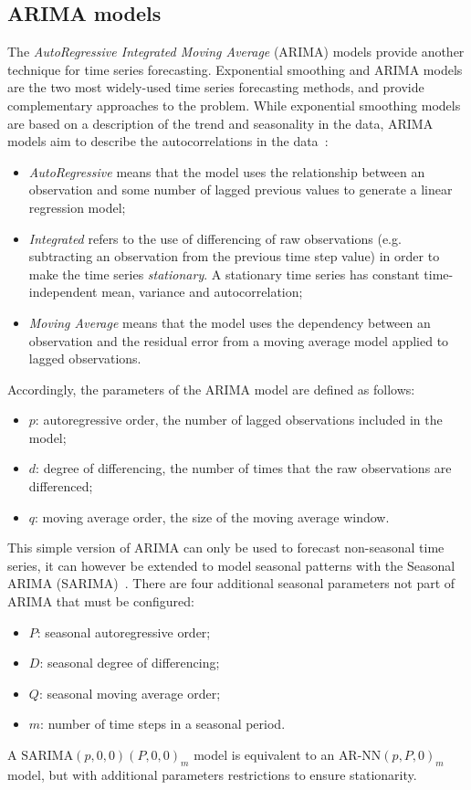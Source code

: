 \subsection{ARIMA models}
\label{subsec:arima_models}
The \emph{AutoRegressive Integrated Moving Average} (ARIMA) models provide another technique for time series forecasting. Exponential smoothing and ARIMA models are the two most widely-used time series forecasting methods, and provide complementary approaches to the problem. While exponential smoothing models are based on a description of the trend and seasonality in the data, ARIMA models aim to describe the autocorrelations in the data~\cite{jenkins}:
\begin{itemize}
  \item \emph{AutoRegressive} means that the model uses the relationship between an observation and some number of lagged previous values to generate a linear regression model;
  \item \emph{Integrated} refers to the use of differencing of raw observations (e.g. subtracting an observation from the previous time step value) in order to make the time series \emph{stationary}. A stationary time series has constant time-independent mean, variance and autocorrelation;
  \item \emph{Moving Average} means that the model uses the dependency between an observation and the residual error from a moving average model applied to lagged observations.
\end{itemize}
Accordingly, the parameters of the ARIMA model are defined as follows:
\begin{itemize}
  \item \( p \): autoregressive order, the number of lagged observations included in the model;
  \item \( d \): degree of differencing, the number of times that the raw observations are differenced;
  \item \( q \): moving average order, the size of the moving average window.
\end{itemize}
This simple version of ARIMA can only be used to forecast non-seasonal time series, it can however be extended to model seasonal patterns with the Seasonal ARIMA (SARIMA)~\cite{hyndman2018}. There are four additional seasonal parameters not part of ARIMA that must be configured:
\begin{itemize}
  \item \( P \): seasonal autoregressive order;
  \item \( D \): seasonal degree of differencing;
  \item \( Q \): seasonal moving average order;
  \item \( m \): number of time steps in a seasonal period.
\end{itemize}
A \( \text{SARIMA}(p,0,0)(P,0,0)_m \) model is equivalent to an \( \text{AR-NN}(p,P,0)_m \) model, but with additional parameters restrictions to ensure stationarity.

